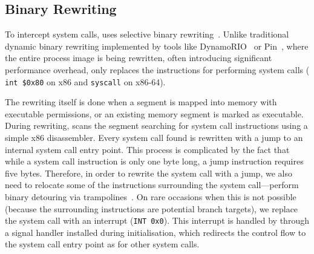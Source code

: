 \subsection{Binary Rewriting}
\label{sec:rewriting}


To intercept system calls, \varan uses selective binary
rewriting~\cite{bird}. Unlike traditional dynamic binary rewriting
implemented by tools like DynamoRIO~\cite{dynamorio02} or
Pin~\cite{pin05}, where the entire process image is being rewritten,
often introducing significant performance overhead, \varan only
replaces the instructions for performing system calls (\ie
\lstinline[language={[x64]Assembler}]`int $0x80` on x86 and
\lstinline[language={[x64]Assembler}]`syscall` on x86-64).

The rewriting itself is done when a segment is mapped into memory with
executable permissions, or an existing memory segment is marked as
executable.  
During rewriting, \varan scans the segment searching for system call
instructions using a simple x86 disassembler.  Every system call found
is rewritten with a jump to an internal system call entry point. This
process is complicated by the fact that while a system call
instruction is only one byte long, a jump instruction requires five
bytes.  Therefore, in order to rewrite the system call with a jump, we
also need to relocate some of the instructions surrounding the system
call---\ie perform binary detouring via trampolines~\cite{detours}.
On rare occasions when this is not possible (\eg because the
surrounding instructions are potential branch targets), we replace the
system call with an interrupt (\lstinline`INT 0x0`).  This interrupt
is handled by \varan through a signal handler installed during
initialisation, which redirects the control flow to the system call
entry point as for other system calls.

